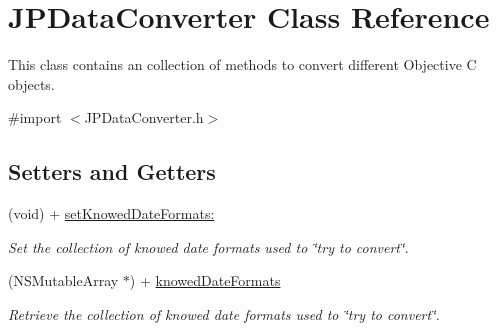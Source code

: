 \hypertarget{interface_j_p_data_converter}{
\section{JPDataConverter Class Reference}
\label{interface_j_p_data_converter}
}


This class contains an collection of methods to convert different Objective C objects.  




{\ttfamily \#import $<$JPDataConverter.h$>$}

\subsection*{Setters and Getters}
\begin{DoxyCompactItemize}
\item 
(void) + \hyperlink{interface_j_p_data_converter_af9806e3698e497ed6ee8ba01bb155548}{setKnowedDateFormats:}
\begin{DoxyCompactList}\small\item\em Set the collection of knowed date formats used to \char`\"{}try to convert\char`\"{}. \item\end{DoxyCompactList}\item 
(NSMutableArray $\ast$) + \hyperlink{interface_j_p_data_converter_a6ebd91ce6791893bc1a24484b083164b}{knowedDateFormats}
\begin{DoxyCompactList}\small\item\em Retrieve the collection of knowed date formats used to \char`\"{}try to convert\char`\"{}. \item\end{DoxyCompactList}\end{DoxyCompactItemize}
